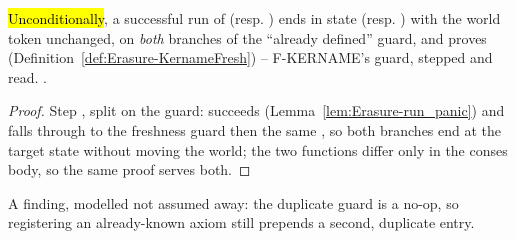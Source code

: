 \begin{theorem}
\label{thm:Erasure-run_addAxiom_ok}
\leanok
{}
 \hl{Unconditionally}, a successful run of  (resp.
) ends in state  (resp.
) with the world token unchanged, on \emph{both} branches of the
``already defined'' guard, and proves 
(Definition~\ref{def:Erasure-KernameFresh}) -- F-KERNAME's guard, stepped and read.
 \stProved{}.
\end{theorem}
\begin{proof}
\leanok
{}
 Step , split on the guard:  succeeds
(Lemma~\ref{lem:Erasure-run_panic}) and falls through to the freshness guard then the same
, so both branches end at the target state without moving the world; the two
functions differ only in the conses body, so the same proof serves both.
\end{proof}

\begin{remark}
 A finding, modelled not assumed away: the duplicate guard is a no-op, so registering
an already-known axiom still prepends a second, duplicate entry.
\end{remark}

